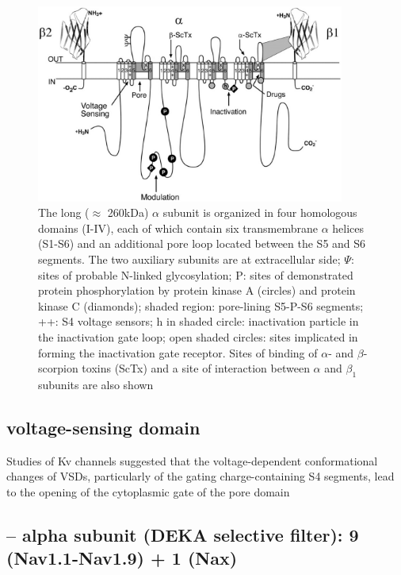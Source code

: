 \begin{figure}[hbt]
  \centerline{\includegraphics[height=6.5cm,
    angle=0]{./images/Na-channel-structure.eps}}
  \caption{The long ($\approx$ 260kDa) $\alpha$ subunit is organized in four
  homologous domains (I-IV), each of which contain six transmembrane $\alpha$
  helices (S1-S6) and an additional pore loop located between the S5 and S6
  segments.
  The two auxiliary subunits are at extracellular side; $\Psi$: sites of
  probable N-linked glycosylation; P: sites of demonstrated protein
  phosphorylation by protein kinase A (circles) and protein kinase C (diamonds);
  shaded region: pore-lining S5-P-S6 segments; ++: S4 voltage sensors; h in
  shaded circle: inactivation particle in the inactivation gate loop; open
  shaded circles: sites implicated in forming the inactivation gate receptor.
  Sites of binding of $\alpha$- and $\beta$-scorpion toxins (ScTx) and a site of
  interaction between $\alpha$ and $\beta_1$ subunits are also shown}
  \label{fig:Na-channel-structure}
\end{figure}

\subsection{voltage-sensing domain}
\label{sec:voltage-sensing-domain}
\label{sec:VSD-voltage-sensing-domain}

Studies of Kv channels suggested that the voltage-dependent conformational
changes of VSDs, particularly of the gating charge-containing S4 segments, lead
to the opening of the cytoplasmic gate of the pore domain


 \subsection{-- alpha subunit (DEKA selective filter): 9 (Nav1.1-Nav1.9) + 1
(Nax)}
\label{sec:Na-channel-alpha-subunit}
\label{sec:DEKA-motif}



